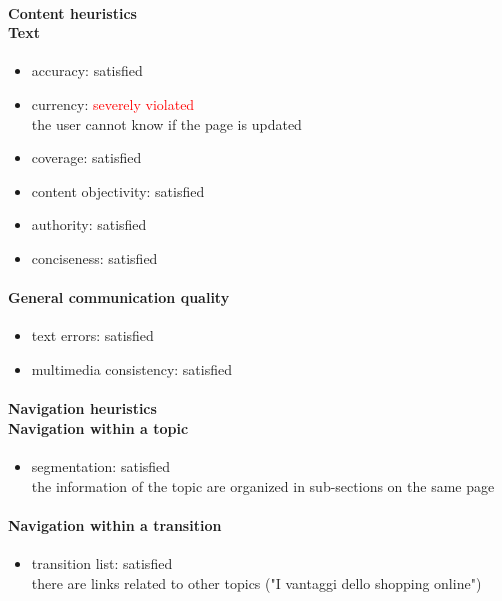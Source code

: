 \begin{enumerate}
	\paragraph*{Content heuristics \\ Text}
	\begin{itemize}
		\item accuracy: satisfied
		\item currency: \textcolor{red}{severely violated}\\the user cannot know if the page is updated
		\item coverage: satisfied
		\item content objectivity: satisfied
		\item authority: satisfied
		\item conciseness: satisfied		
	\end{itemize}

	\paragraph*{General communication quality}
	\begin{itemize}
		\item text errors: satisfied
		\item multimedia consistency: satisfied
	\end{itemize}

	\paragraph*{Navigation heuristics \\ Navigation within a topic}
	\begin{itemize}
		\item segmentation: satisfied\\
		the information of the topic are organized in sub-sections on the same page
	\end{itemize}	

	\paragraph*{Navigation within a transition}
	\begin{itemize}
		\item transition list: satisfied\\
		there are links related to other topics ("I vantaggi dello shopping online")
	\end{itemize}


\end{enumerate}
